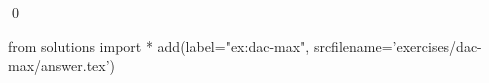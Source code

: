 
\begin{ex} 
  \label{ex:dac-max}
  
  \qed
\end{ex} 
\begin{python0}
from solutions import *
add(label="ex:dac-max",
    srcfilename='exercises/dac-max/answer.tex') 
\end{python0}
